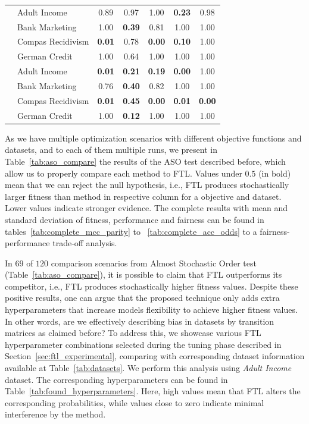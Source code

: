 \begin{table}[ht]
{\begin{tabular}{llccccc}
 & Adult Income & 0.89 & 0.97 & 1.00 & \textbf{0.23} & 0.98 \\
 & Bank Marketing & 1.00 & \textbf{0.39} & 0.81 & 1.00 & 1.00 \\
 & Compas Recidivism & \textbf{0.01} & 0.78 & \textbf{0.00} & \textbf{0.10} & 1.00 \\
 & German Credit & 1.00 & 0.64 & 1.00 & 1.00 & 1.00 \vspace{1ex}\\

 & Adult Income & \textbf{0.01} & \textbf{0.21} & \textbf{0.19} & \textbf{0.00} & 1.00 \\
 & Bank Marketing & 0.76 & \textbf{0.40} & 0.82 & 1.00 & 1.00 \\
 & Compas Recidivism & \textbf{0.01} & \textbf{0.45} & \textbf{0.00} & \textbf{0.01} & \textbf{0.00} \\
 & German Credit & 1.00 & \textbf{0.12} & 1.00 & 1.00 & 1.00 \\

\bottomrule
\end{tabular}


    }
\end{table}

As we have multiple optimization scenarios with different objective functions and datasets, and to each of them multiple runs, we present in Table~\ref{tab:aso_compare} the results of the ASO test described before, which allow us to properly compare each method to FTL. Values under $0.5$ (in bold) mean that we can reject the null hypothesis, i.e., FTL produces stochastically larger fitness than method in respective column for a objective and dataset. Lower values indicate stronger evidence. The complete results with mean and standard deviation of fitness, performance and fairness can be found in tables~\ref{tab:complete_mcc_parity} to ~\ref{tab:complete_acc_odds} to a fairness-performance trade-off analysis.

In $69$ of $120$ comparison scenarios from Almost Stochastic Order test (Table~\ref{tab:aso_compare}), it is possible to claim that FTL outperforms its competitor, i.e., FTL produces stochastically higher fitness values. Despite these positive results, one can argue that the proposed technique only adds extra hyperparameters that increase models flexibility to achieve higher fitness values. In other words, are we effectively describing bias in datasets by transition matrices as claimed before? To address this, we showcase various FTL hyperparameter combinations selected during the tuning phase described in Section~\ref{sec:ftl_experimental}, comparing with corresponding dataset information available at Table~\ref{tab:datasets}. We perform this analysis using \textit{Adult Income} dataset. The corresponding hyperparameters can be found in Table~\ref{tab:found_hyperparameters}. Here, high values mean that FTL alters the corresponding probabilities, while values close to zero indicate minimal interference by the method.

